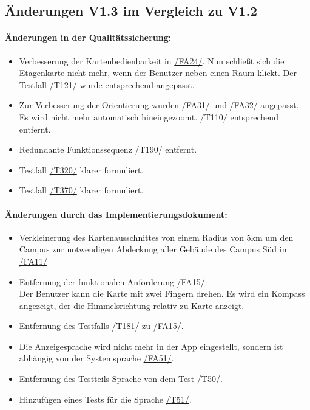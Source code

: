 \subsection*{Änderungen V1.3 im Vergleich zu V1.2}
\paragraph*{Änderungen in der Qualitätssicherung:}
\begin{itemize}
    \item Verbesserung der Kartenbedienbarkeit in \hyperref[/FA24/]{/FA24/}. Nun schließt sich die Etagenkarte nicht mehr, wenn der Benutzer neben einen Raum klickt. Der Testfall \hyperref[/T121/]{/T121/} wurde entsprechend angepasst.
    \item Zur Verbesserung der Orientierung wurden \hyperref[/FA31/]{/FA31/} und \hyperref[/FA32/]{/FA32/} angepasst. Es wird nicht mehr automatisch hineingezoomt. /T110/ entsprechend entfernt.
    \item Redundante Funktionssequenz /T190/ entfernt.
    \item Testfall \hyperref[/T320/]{/T320/} klarer formuliert.
    \item Testfall \hyperref[/T370/]{/T370/} klarer formuliert.
\end{itemize}

\paragraph*{Änderungen durch das Implementierungsdokument:}
\begin{itemize}
    \item Verkleinerung des Kartenausschnittes von einem Radius von 5km um den \Gls{Campus} zur notwendigen Abdeckung aller Gebäude des \Gls{Campus} Süd in \hyperref[/FA11/]{/FA11/}
    \item Entfernung der funktionalen Anforderung /FA15/: \\ Der \Gls{Benutzer} kann die \Gls{Karte} mit zwei Fingern drehen. Es wird ein Kompass angezeigt, der die Himmelsrichtung relativ zu \Gls{Karte} anzeigt.
    \item Entfernung des Testfalls /T181/ zu /FA15/.
    \item Die Anzeigesprache wird nicht mehr in der App eingestellt, sondern ist abhängig von der Systemsprache \hyperref[/FA51/]{/FA51/}.
    \item Entfernung des Testteils Sprache von dem Test \hyperref[/T50/]{/T50/}.
    \item Hinzufügen eines Tests für die Sprache \hyperref[/T51/]{/T51/}.
\end{itemize}